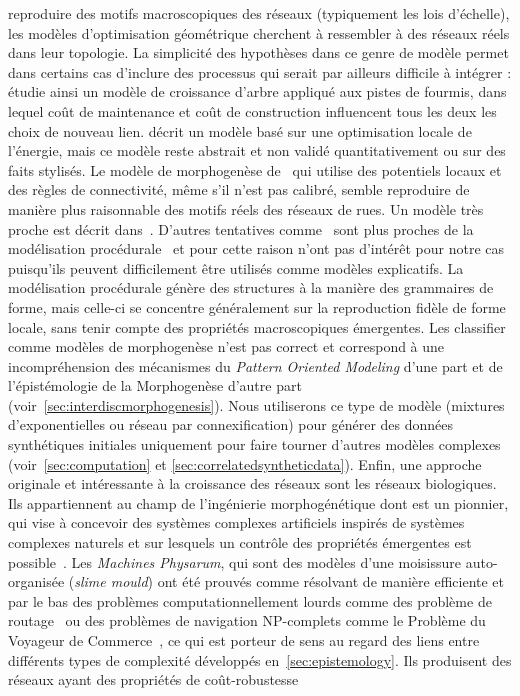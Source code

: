 {reproduire des motifs macroscopiques des réseaux (typiquement les lois d'échelle), les modèles d'optimisation géométrique cherchent à ressembler à des réseaux réels dans leur topologie. La simplicité des hypothèses dans ce genre de modèle permet dans certains cas d'inclure des processus qui serait par ailleurs difficile à intégrer : \cite{2016arXiv160906470B} étudie ainsi un modèle de croissance d'arbre appliqué aux pistes de fourmis, dans lequel coût de maintenance et coût de construction influencent tous les deux les choix de nouveau lien. \cite{barthelemy2008modeling} décrit un modèle basé sur une optimisation locale de l'énergie, mais ce modèle reste abstrait et non validé quantitativement ou sur des faits stylisés. Le modèle de morphogenèse de~\cite{courtat2011mathematics} qui utilise des potentiels locaux et des règles de connectivité, même s'il n'est pas calibré, semble reproduire de manière plus raisonnable des motifs réels des réseaux de rues. Un modèle très proche est décrit dans~\cite{rui2013exploring}. D'autres tentatives comme~\cite{de2007netlogo,yamins2003growing} sont plus proches de la modélisation procédurale~\cite{lechner2004procedural,watson2008procedural} et pour cette raison n'ont pas d'intérêt pour notre cas puisqu'ils peuvent difficilement être utilisés comme modèles explicatifs. La modélisation procédurale génère des structures à la manière des grammaires de forme, mais celle-ci se concentre généralement sur la reproduction fidèle de forme locale, sans tenir compte des propriétés macroscopiques émergentes. Les classifier comme modèles de morphogenèse n'est pas correct et correspond à une incompréhension des mécanismes du \emph{Pattern Oriented Modeling} d'une part et de l'épistémologie de la Morphogenèse d'autre part (voir~\ref{sec:interdiscmorphogenesis}). Nous utiliserons ce type de modèle (mixtures d'exponentielles ou réseau par connexification) pour générer des données synthétiques initiales uniquement pour faire tourner d'autres modèles complexes (voir~\ref{sec:computation} et \ref{sec:correlatedsyntheticdata}). Enfin, une approche originale et intéressante à la croissance des réseaux sont les réseaux biologiques. Ils appartiennent au champ de l'ingénierie morphogénétique dont  est un pionnier, qui vise à concevoir des systèmes complexes artificiels inspirés de systèmes complexes naturels et sur lesquels un contrôle des propriétés émergentes est possible~\cite{doursat2012morphogenetic}. Les \emph{Machines Physarum}, qui sont des modèles d'une moisissure auto-organisée (\emph{slime mould}) ont été prouvés comme résolvant de manière efficiente et par le bas des problèmes computationnellement lourds comme des problème de routage~\cite{tero2006physarum} ou des problèmes de navigation NP-complets comme le Problème du Voyageur de Commerce~\cite{zhu2013amoeba}, ce qui est porteur de sens au regard des liens entre différents types de complexité développés en~\ref{sec:epistemology}. Ils produisent des réseaux ayant des propriétés de coût-robustesse }
